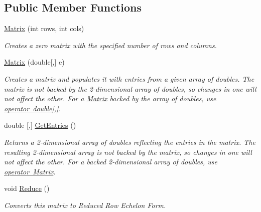 \subsection*{Public Member Functions}
\begin{DoxyCompactItemize}
\item 
\mbox{\hyperlink{class_matrix_demo_1_1_r_t_w_1_1_matrix_a8c22efc901ad89be3078a180a7ac15d0}{Matrix}} (int rows, int cols)
\begin{DoxyCompactList}\small\item\em Creates a zero matrix with the specified number of rows and columns. \end{DoxyCompactList}\item 
\mbox{\hyperlink{class_matrix_demo_1_1_r_t_w_1_1_matrix_ad2a320fd0c86551f34070679fd43433c}{Matrix}} (double\mbox{[},\mbox{]} e)
\begin{DoxyCompactList}\small\item\em Creates a matrix and populates it with entries from a given array of doubles. The matrix is not backed by the 2-\/dimensional array of doubles, so changes in one will not affect the other. For a \mbox{\hyperlink{class_matrix_demo_1_1_r_t_w_1_1_matrix}{Matrix}} backed by the array of doubles, use \mbox{\hyperlink{class_matrix_demo_1_1_r_t_w_1_1_matrix_ac23641ac04b3c3baf14174bdf9049db2}{operator double\mbox{[},\mbox{]}}}. \end{DoxyCompactList}\item 
double \mbox{[},\mbox{]} \mbox{\hyperlink{class_matrix_demo_1_1_r_t_w_1_1_matrix_a9f6f8e0e7acfbdd55852f258daf68b8f}{Get\+Entries}} ()
\begin{DoxyCompactList}\small\item\em Returns a 2-\/dimensional array of doubles reflecting the entries in the matrix. The resulting 2-\/dimensional array is not backed by the matrix, so changes in one will not affect the other. For a backed 2-\/dimensional array of doubles, use \mbox{\hyperlink{class_matrix_demo_1_1_r_t_w_1_1_matrix_a0c737f7e6b54edac4d26b4f1c595ee92}{operator Matrix}}. \end{DoxyCompactList}\item 
void \mbox{\hyperlink{class_matrix_demo_1_1_r_t_w_1_1_matrix_a14fc1e8ce8136690364961901e7becf6}{Reduce}} ()
\begin{DoxyCompactList}\small\item\em Converts this matrix to Reduced Row Echelon Form. \end{DoxyCompactList}\item 

\end{DoxyCompactItemize}
